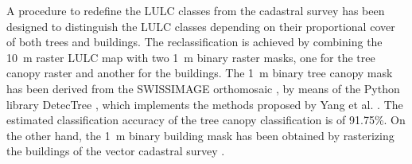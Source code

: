 \documentclass[10pt,letterpaper]{article}
\begin{document}
A procedure to redefine the LULC classes from the cadastral survey has been designed to distinguish the LULC classes depending on their proportional cover of both trees and buildings. The reclassification is achieved by combining the 10~m raster LULC map with two 1~m binary raster masks, one for the tree canopy raster and another for the buildings. %
The 1~m binary tree canopy mask has been derived from the SWISSIMAGE orthomosaic \cite{swisstopo2019swissimage}, by means of the Python library DetecTree \cite{bosch2020detectree}, which implements the methods proposed by Yang et al. \cite{yang2009tree}. The estimated classification accuracy of the tree canopy classification is of 91.75\%. On the other hand, the 1~m binary building mask has been obtained by rasterizing the buildings of the vector cadastral survey \cite{asitvd2018structure}.
\end{document}
